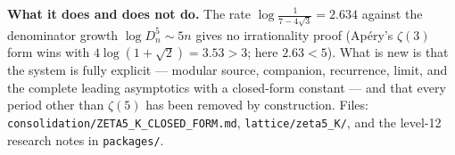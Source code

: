 \documentclass[10pt]{article}
\begin{document}
\textbf{What it does and does not do.} The rate $\log\frac1{7-4\sqrt3}=2.634$ against the denominator growth $\log D_n^5\sim5n$ gives no irrationality proof (Ap\'ery's $\zeta(3)$ form wins with $4\log(1+\sqrt2)=3.53>3$; here $2.63<5$). What is new is that the system is fully explicit --- modular source, companion, recurrence, limit, and the complete leading asymptotics with a closed-form constant --- and that every period other than $\zeta(5)$ has been removed by construction. Files: \texttt{consolidation/ZETA5\_K\_CLOSED\_FORM.md}, \texttt{lattice/zeta5\_K/}, and the level-12 research notes in \texttt{packages/}.
\end{document}
